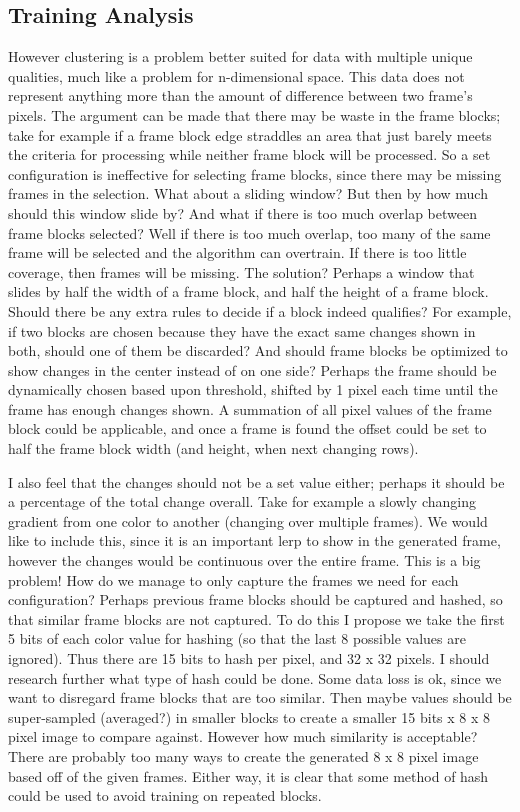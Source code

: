 \documentclass[conference]{IEEEtran}
\begin{document}
\subsection{Training Analysis}
\label{subsec:training_analysis}
However clustering is a problem better suited for data with multiple unique qualities,
much like a problem for n-dimensional space.
This data does not represent anything more than the amount of difference between two frame's pixels.
The argument can be made that there may be waste in the frame blocks; take for example if a
frame block edge straddles an area that just barely meets the criteria for processing while neither frame block will be processed.
So a set configuration is ineffective for selecting frame blocks, since there may be missing frames in the selection.
What about a sliding window? But then by how much should this window slide by? And what if there is too much overlap between frame blocks selected?
Well if there is too much overlap, too many of the same frame will be selected and the algorithm can overtrain.
If there is too little coverage, then frames will be missing.
The solution? Perhaps a window that slides by half the width of a frame block, and half the height of a frame block.
Should there be any extra rules to decide if a block indeed qualifies?
For example, if two blocks are chosen because they have the exact same changes shown in both, should one of them be discarded?
And should frame blocks be optimized to show changes in the center instead of on one side?
Perhaps the frame should be dynamically chosen based upon threshold, shifted by 1 pixel each time until the frame has enough changes shown.
A summation of all pixel values of the frame block could be applicable,
and once a frame is found the offset could be set to half the frame block width
(and height, when next changing rows).

I also feel that the changes should not be a set value either; perhaps it should be a percentage of the total change overall.
Take for example a slowly changing gradient from one color to another (changing over multiple frames).
We would like to include this, since it is an important lerp to show in the generated frame,
however the changes would be continuous over the entire frame. This is a big problem!
How do we manage to only capture the frames we need for each configuration?
Perhaps previous frame blocks should be captured and hashed, so that similar frame blocks are not captured.
To do this I propose we take the first 5 bits of each color value for hashing (so that the last 8 possible values are ignored).
Thus there are 15 bits to hash per pixel, and 32 x 32 pixels. I should research further what type of hash could be done.
Some data loss is ok, since we want to disregard frame blocks that are too similar.
Then maybe values should be super-sampled (averaged?) in smaller blocks to create a smaller 15 bits x 8 x 8 pixel image to compare against.
However how much similarity is acceptable? There are probably too many ways to create the generated 8 x 8 pixel image based off of the given frames.
Either way, it is clear that some method of hash could be used to avoid training on repeated blocks.
\end{document}

